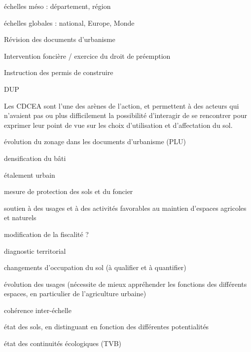 	\stopitemize

\item échelles méso : département, région

\item échelles globales : national, Europe, Monde

\stopitemize
\stopcolumns

\startcolumns[n=2]


\startitemize[packed]

\item Révision des documents d'urbanisme
\item Intervention foncière / exercice du droit de préemption
\item Instruction des permis de construire
\item DUP

\stopitemize

Les CDCEA sont l'une des arènes de l'action,
et permettent à des acteurs qui n'avaient pas
ou plus difficilement la possibilité d'interagir
de se rencontrer pour exprimer leur point de vue
sur les choix d'utilisation et d'affectation du sol.

\column
{}

\startitemize[packed]

\item évolution du zonage dans les documents d'urbanisme (PLU)
\item densification du bâti
\item étalement urbain
\item mesure de protection des sols et du foncier
\item soutien à des usages et à des activités favorables
  au maintien d'espaces agricoles et naturels
\item modification de la fiscalité ?

\stopitemize
\stopcolumns


\startcolumns[2]
\startitemize[packed]

\item diagnostic territorial
\item changements d'occupation du sol (à qualifier et à quantifier)
\item évolution des usages (nécessite de mieux appréhender les fonctions
  des différents espaces, en particulier de l'agriculture urbaine)
\item cohérence inter-échelle
\item état des sols, en distinguant en fonction
  des différentes potentialités
\item état des continuités écologiques (TVB)

\stopitemize
\stopcolumns

\setcounter[subsection][4]